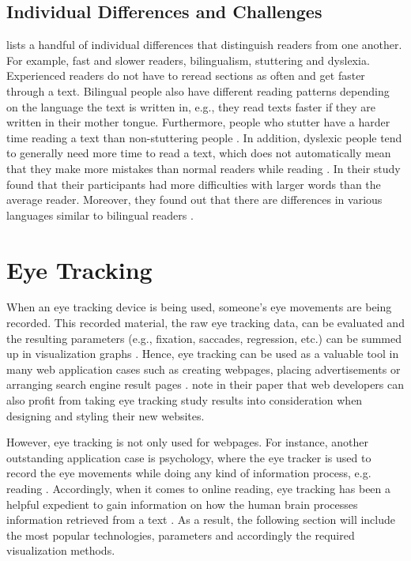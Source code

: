 \subsection{Individual Differences and Challenges}
\label{subsection:Differences}
\textcite{rayner1998eye} lists a handful of individual differences that distinguish readers from one another. For example, fast and slower readers, bilingualism, stuttering and dyslexia. Experienced readers do not have to reread sections as often and get faster through a text. Bilingual people also have different reading patterns depending on the language the text is written in, e.g., they read texts faster if they are written in their mother tongue. Furthermore, people who stutter have a harder time reading a text than non-stuttering people \autocite{rayner1998eye}. 
In addition, dyslexic people tend to generally need more time to read a text, which does not automatically mean that they make more mistakes than normal readers while reading \autocite{rayner1998eye, hutzler2004eye}.
In their study \textcite{hutzler2004eye} found that their participants had more difficulties with larger words than the average reader.
Moreover, they found out that there are differences in various languages similar to bilingual readers \autocite{hutzler2004eye, rayner1998eye}.

\section{Eye Tracking}
\label{section:EyeTracking}
When an eye tracking device is being used, someone's eye movements are being recorded. This recorded material, the raw eye tracking data, can be evaluated and the resulting parameters (e.g., fixation, saccades, regression, etc.) can be summed up in visualization graphs \autocite[]{goldberg2002eye, poole2006eye, beymer2007eye}. Hence, eye tracking can be used as a valuable tool in many web application cases such as creating webpages, placing advertisements or arranging search engine result pages \autocite{buscher2009you, liu2015influence}. \textcite[]{buscher2009you} note in their paper that web developers can also profit from taking eye tracking study results into consideration when designing and styling their new websites. 

However, eye tracking is not only used for webpages. For instance, another outstanding application case is psychology, where the eye tracker is used to record the eye movements while doing any kind of information process, e.g. reading \autocite{schiessl2003eye}.
Accordingly, when it comes to online reading, eye tracking has been a helpful expedient to gain information on how the human brain processes information retrieved from a text \autocite[]{schiessl2003eye}.
As a result, the following section will include the most popular technologies, parameters and accordingly the required visualization methods. 

